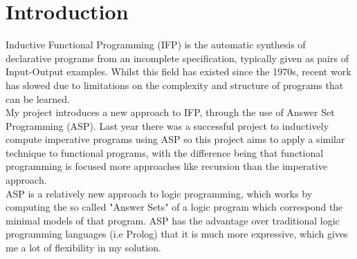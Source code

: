 \chapter{Introduction}

Inductive Functional Programming (IFP) is the automatic synthesis of declarative programs from an incomplete specification, typically given as pairs of Input-Output examples. Whilst this field has existed since the 1970s, recent work has slowed due to limitations on the complexity and structure of programs that can be learned. \\

My project introduces a new approach to IFP, through the use of Answer Set Programming (ASP). Last year there was a successful project to inductively compute imperative programs using ASP so this project aims to apply a similar technique to functional programs, with the difference being that functional programming is focused more approaches like recursion than the imperative approach. \\

ASP is a relatively new approach to logic programming, which works by computing the so called "Answer Sets" of a logic program which correspond the minimal models of that program. ASP has the advantage over traditional logic programming languages (i.e Prolog) that it is much more expressive, which gives me a lot of flexibility in my solution.


\pagebreak
\renewcommand\bibname{{References}}

